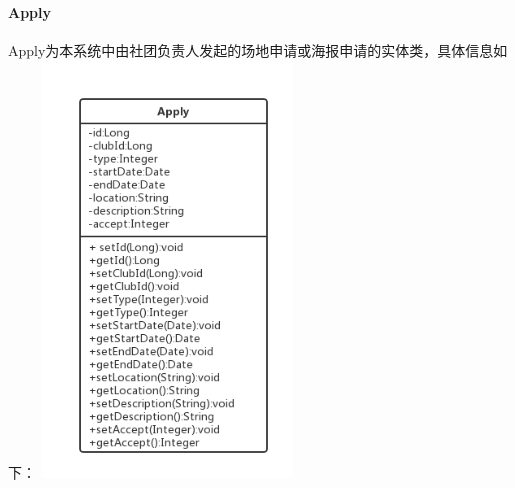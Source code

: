 \documentclass[UTF8]{ctexart}
\begin{document}
\paragraph{Apply}
Apply为本系统中由社团负责人发起的场地申请或海报申请的实体类，具体信息如下：
\newline
\includegraphics[width = 0.5\textwidth]{apply-class.png}
\newline
\end{document}
